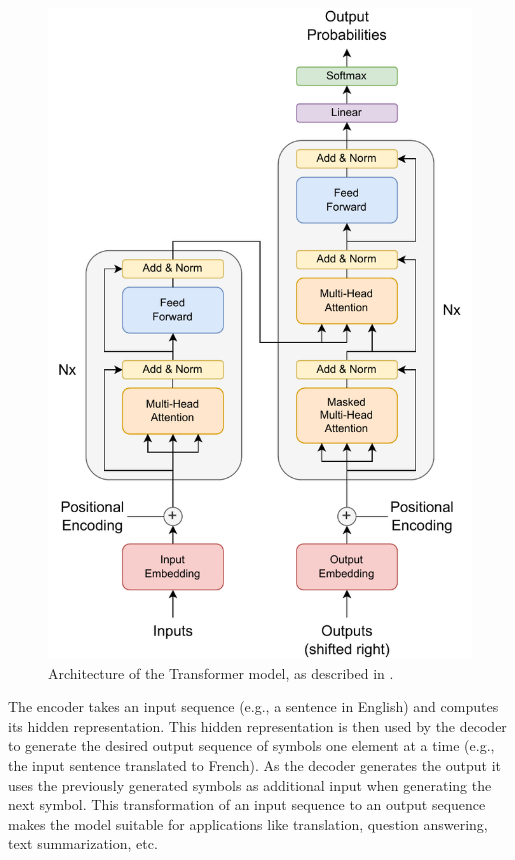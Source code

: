 \begin{figure}[H]
    \centering
    \includegraphics[scale=0.7]{obrazky-figures/transformer.pdf}
    \caption{Architecture of the Transformer model, as described in \cite{transformer}.}
    \label{fig:transformer}
\end{figure}

The encoder takes an input sequence (e.g., a sentence in English) and computes its hidden representation. This hidden representation is then used by the decoder to generate the desired output sequence of symbols one element at a time (e.g., the input sentence translated to French). As the decoder generates the output it uses the previously generated symbols as additional input when generating the next symbol. This transformation of an input sequence to an output sequence makes the model suitable for applications like translation, question answering, text summarization, etc.

